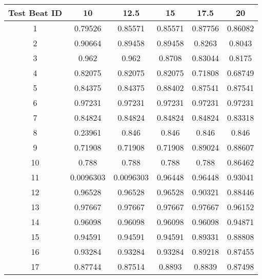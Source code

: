\begin{tabular}{|c|c|c|c|c|c|}
\hline 
Test Beat ID & 10 & 12.5 & 15 & 17.5 & 20 \\ 
\hline 
1 & 0.79526 & 0.85571 & 0.85571 & 0.87756 & 0.86082 \\ 
2 & 0.90664 & 0.89458 & 0.89458 & 0.8263 & 0.8043 \\ 
3 & 0.962 & 0.962 & 0.8708 & 0.83044 & 0.8175 \\ 
4 & 0.82075 & 0.82075 & 0.82075 & 0.71808 & 0.68749 \\ 
5 & 0.84375 & 0.84375 & 0.88402 & 0.87541 & 0.87541 \\ 
6 & 0.97231 & 0.97231 & 0.97231 & 0.97231 & 0.97231 \\ 
7 & 0.84824 & 0.84824 & 0.84824 & 0.84824 & 0.83318 \\ 
8 & 0.23961 & 0.846 & 0.846 & 0.846 & 0.846 \\ 
9 & 0.71908 & 0.71908 & 0.71908 & 0.89024 & 0.88607 \\ 
10 & 0.788 & 0.788 & 0.788 & 0.788 & 0.86462 \\ 
11 & 0.0096303 & 0.0096303 & 0.96448 & 0.96448 & 0.93041 \\ 
12 & 0.96528 & 0.96528 & 0.96528 & 0.90321 & 0.88446 \\ 
13 & 0.97667 & 0.97667 & 0.97667 & 0.97667 & 0.96152 \\ 
14 & 0.96098 & 0.96098 & 0.96098 & 0.96098 & 0.94871 \\ 
15 & 0.94591 & 0.94591 & 0.94591 & 0.89331 & 0.88808 \\ 
16 & 0.93284 & 0.93284 & 0.93284 & 0.89218 & 0.87455 \\ 
17 & 0.87744 & 0.87514 & 0.8893 & 0.8839 & 0.87498 \\ 
\hline 
\end{tabular}